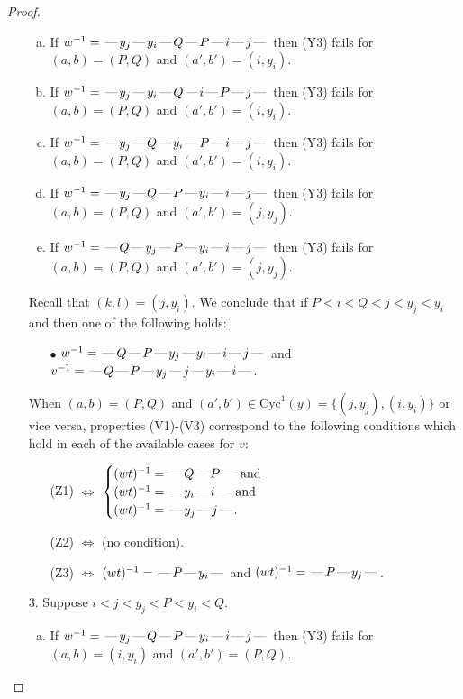 \documentclass[10pt]{article}
\theoremstyle{definition}
\theoremstyle{definition}
\def\dash{\text{\hspace{0.5mm}---\hspace{0.5mm}}}
\def\Cyc{\mathrm{Cyc}}
\begin{document}
\begin{proof}
\begin{enumerate}
\begin{enumerate}[(a)]
\item If $w^{-1} = \dash y_j\dash y_i\dash Q\dash P\dash i\dash j\dash $ then (Y3) fails for $(a,b)=(P,Q)$ and $(a',b')=(i,y_i)$.
\item If $w^{-1} = \dash y_j\dash y_i\dash Q\dash i\dash P\dash j\dash $ then (Y3) fails for $(a,b)=(P,Q)$ and $(a',b')=(i,y_i)$.
\item If $w^{-1} = \dash y_j\dash Q\dash y_i\dash P\dash i\dash j\dash $ then (Y3) fails for $(a,b)=(P,Q)$ and $(a',b')=(i,y_i)$.
\item If $w^{-1} = \dash y_j\dash Q\dash P\dash y_i\dash i\dash j\dash $ then (Y3) fails for $(a,b)=(P,Q)$ and $(a',b')=(j,y_j)$.
\item If $w^{-1} = \dash Q\dash y_j\dash P\dash y_i\dash i\dash j\dash $ then (Y3) fails for $(a,b)=(P,Q)$ and $(a',b')=(j,y_j)$.
\end{enumerate}
Recall that $(k,l) = (j,y_i)$.
We conclude that if $P < i < Q < j < y_j < y_i$ and then one of the following holds:
\begin{enumerate}
\item[$\bullet$] $w^{-1} = \dash Q\dash P\dash y_j\dash y_i\dash i\dash j\dash $ and $v^{-1} = \dash Q\dash P\dash y_j\dash j\dash y_i\dash i\dash $.
\end{enumerate}
When $(a,b)= (P,Q)$ and $(a',b')\in \Cyc^1(y)=\{(j,y_j),(i,y_i)\}$ or vice versa,
properties (V1)-(V3) correspond to the following conditions which hold in
each of the available cases for $v$:
\begin{enumerate}
\item[](Z1) $\Leftrightarrow$ $\begin{cases}\text{$(wt)^{-1} = \dash Q \dash P \dash$}\text{ and }\\
\text{$(wt)^{-1} = \dash y_i \dash i \dash$}\text{ and }\\
\text{$(wt)^{-1} = \dash y_j \dash j \dash$}.\end{cases}$
\item[](Z2) $\Leftrightarrow$ (no condition).
\item[](Z3) $\Leftrightarrow$ $(wt)^{-1} = \dash P \dash y_i \dash$  and $(wt)^{-1} = \dash P \dash y_j \dash$.
\end{enumerate}
\item[$3$.] Suppose $i < j < y_j < P < y_i < Q$.
\begin{enumerate}[(a)]
\item If $w^{-1} = \dash y_j\dash Q\dash P\dash y_i\dash i\dash j\dash $ then (Y3) fails for $(a,b)=(i,y_i)$ and $(a',b')=(P,Q)$.

\end{enumerate}
\end{enumerate}
\end{proof}
\end{document}
